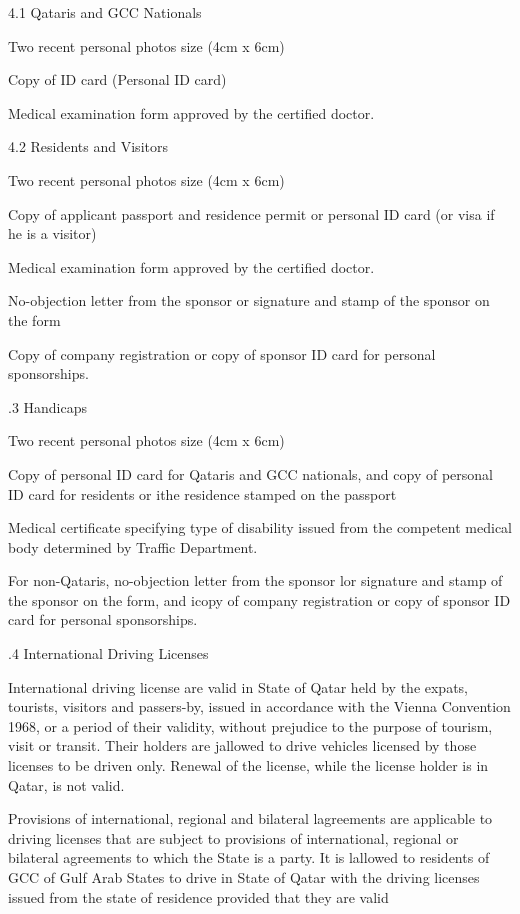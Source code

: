 \documentclass{book}
\begin{document}
4.1 Qataris and GCC Nationals

Two recent personal photos size (4cm x 6cm)

Copy of ID card (Personal ID card)

Medical examination form approved by the certified doctor.

4.2 Residents and Visitors

Two recent personal photos size (4cm x 6cm)

Copy of applicant passport and residence permit or personal ID card (or
visa if he is a visitor)

Medical examination form approved by the certified doctor.

No-objection letter from the sponsor or signature and stamp of the
sponsor on the form

Copy of company registration or copy of sponsor ID card for personal
sponsorships.

.3 Handicaps

Two recent personal photos size (4cm x 6cm)

Copy of personal ID card for Qataris and GCC nationals, and copy of
personal ID card for residents or ithe residence stamped on the passport

Medical certificate specifying type of disability issued from the
competent medical body determined by Traffic Department.

For non-Qataris, no-objection letter from the sponsor lor signature and
stamp of the sponsor on the form, and icopy of company registration or
copy of sponsor ID card for personal sponsorships.

.4 International Driving Licenses

International driving license are valid in State of Qatar held by the
expats, tourists, visitors and passers-by, issued in accordance with the
Vienna Convention 1968, or a period of their validity, without prejudice
to the purpose of tourism, visit or transit. Their holders are jallowed
to drive vehicles licensed by those licenses to be driven only. Renewal
of the license, while the license holder is in Qatar, is not valid.

Provisions of international, regional and bilateral lagreements are
applicable to driving licenses that are subject to provisions of
international, regional or bilateral agreements to which the State is a
party. It is lallowed to residents of GCC of Gulf Arab States to drive
in State of Qatar with the driving licenses issued from the state of
residence provided that they are valid
\end{document}
